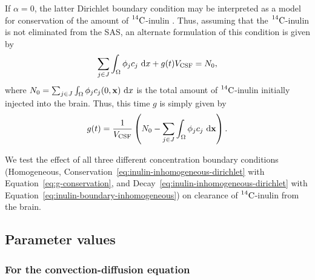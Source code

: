 \documentclass[10pt]{article}
\newcommand{\1}{^{(1)}}
\newcommand{\2}{^{(2)}}
\newcommand*{\dd}{\mathop{\kern0pt\mathrm{d}}\!{}}
\newcommand {\x}   {\mathbf{x}}
\newcommand{\Cinulin}{$\prescript{14}{}{\text{C}}$-inulin }
\newtheorem{remark}[theorem]{Remark}
\begin{document}
If $\alpha = 0$, the latter Dirichlet boundary condition may be interpreted as a model for conservation of the amount of \Cinulin. Thus, assuming that the \Cinulin is not eliminated from the SAS, an alternate formulation of this condition is given by
\begin{equation}
    \sum_{j\in J} \int_\Omega  \phi_j c_j \,\dd x + g(t) V_{\text{CSF}} = N_0,
    \label{eq:inulin-tracer-conservation}
\end{equation}
where $N_0 = \sum_{j\in J} \int_\Omega  \phi_j c_j(0,\x) \,\dd x $ is the total amount of \Cinulin initially injected into the brain. Thus, this time $g$ is simply given by 
\begin{equation}
    g(t) = \frac{1}{ V_{\text{CSF}}}\left( N_0  - \sum_{j\in J} \int_\Omega  \phi_j c_j \,\dd \x \right) .
    \label{eq:g-conservation}
\end{equation}

We test the effect of all three different concentration boundary conditions (Homogeneous, Conservation~\eqref{eq:inulin-inhomogeneous-dirichlet} with Equation~\eqref{eq:g-conservation}, and Decay~\eqref{eq:inulin-inhomogeneous-dirichlet} with Equation~\eqref{eq:inulin-boundary-inhomogeneous}) on clearance of \Cinulin from the brain. 




\subsection{Parameter values}
\label{subsec:para-values}

\subsubsection{For the convection-diffusion equation}
\end{document}

